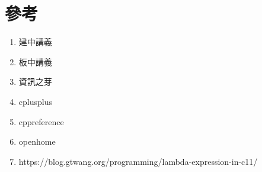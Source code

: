 \section{參考}
\begin{enumerate}
\item 建中講義
\item 板中講義
\item 資訊之芽
\item cplusplus
\item cppreference
\item openhome
\item https://blog.gtwang.org/programming/lambda-expression-in-c11/
\end{enumerate}